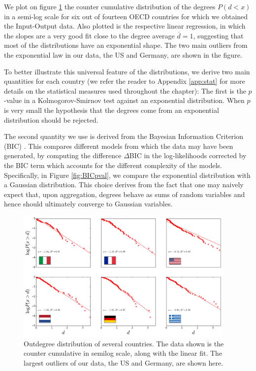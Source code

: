 We plot on figure \ref{fig:6countries} the counter cumulative distribution
of the degrees $P(d < x)$ in a semi-log scale for six out of fourteen
OECD countries for which we obtained the Input-Output data. Also plotted is the
respective linear regression, in which the slopes are a very good fit
close to the degree average $\overline{d}=1$, suggesting that most of the
distributions have an exponential shape. The two main outliers from
the exponential law in our data, the US and Germany, are shown in the
figure.

To better illustrate this universal feature of the distributions, we
derive two main quantities for each country (we refer the reader to
Appendix \ref{app:stat} for more details on the statistical measures used throughout the chapter): The first is the $p$-value in a Kolmogorov-Smirnov 
test against an exponential distribution.%
When $p$ is very small the hypothesis that the degrees come from an
exponential distribution should be rejected. 

The second quantity we use is derived from the Bayesian Information Criterion (BIC)
\cite{Kass95}. This compares different models from which the data may have been generated,
by computing the difference $\Delta$BIC in the log-likelihoods corrected by the BIC term which accounts for
the different complexity of the models. 
Specifically, in Figure \ref{fig:BICpval}, we compare the exponential distribution with a Gaussian distribution. 
This choice derives from the fact that one may naively expect that, upon aggregation, degrees 
behave as sums of random variables and hence should ultimately converge to Gaussian variables. 


\begin{figure}[!ht]
  \centering
  \includegraphics[width=0.95\textwidth]{figs_io/6panel_data.png}
  \caption{Outdegree distribution of several countries. The data shown
    is the counter cumulative in semilog scale, along with the linear
    fit. The largest outliers of our data, the US and Germany, are
    shown here.}
  \label{fig:6countries}
\end{figure}

